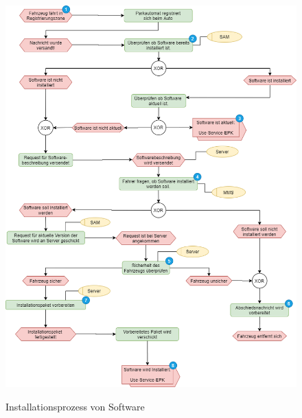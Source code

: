 \begin{figure}[!h]
	\centering
	\includegraphics[width=\columnwidth]{pictures/konzept-Installationsprozess.png}
	\label{img:installationsProtokollExtern}
	\caption{Installationsprozess von Software}
\end{figure}
